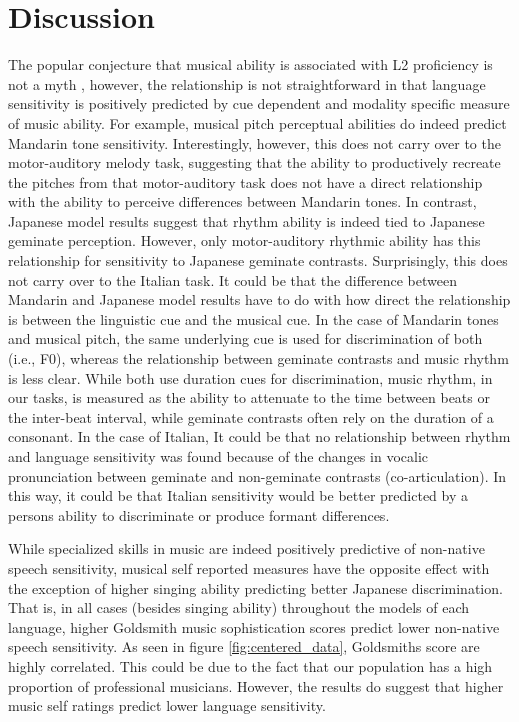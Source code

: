 \documentclass[a4paper]{article}
\begin{document}
\section{Discussion}

The popular conjecture that musical ability is associated with L2 proficiency is not a myth \cite{Slevc_Miyake_2006b}, however, the relationship is not straightforward in that language sensitivity is positively predicted by cue dependent and modality specific measure of music ability. For example, musical pitch perceptual abilities do indeed predict Mandarin tone sensitivity. Interestingly, however, this does not carry over to the motor-auditory melody task, suggesting that the ability to productively recreate the pitches from that motor-auditory task does not have a direct relationship with the ability to perceive differences between Mandarin tones. In contrast, Japanese model results suggest that rhythm ability is indeed tied to Japanese geminate perception. However, only motor-auditory rhythmic ability has this relationship for sensitivity to Japanese geminate contrasts. Surprisingly, this does not carry over to the Italian task. It could be that the difference between Mandarin and Japanese model results have to do with how direct the relationship is between the linguistic cue and the musical cue. In the case of Mandarin tones and musical pitch, the same underlying cue is used for discrimination of both (i.e., F0), whereas the relationship between geminate contrasts and music rhythm is less clear. While both use duration cues for discrimination, music rhythm, in our tasks, is measured as the ability to attenuate to the time between beats or the inter-beat interval, while geminate contrasts often rely on the duration of a consonant. In the case of Italian, It could be that no relationship between rhythm and language sensitivity was found because of the changes in vocalic pronunciation between geminate and non-geminate contrasts (co-articulation). In this way, it could be that Italian sensitivity would be better predicted by a persons ability to discriminate or produce formant differences. 

While specialized skills in music are indeed positively predictive of non-native speech sensitivity, musical self reported measures have the opposite effect with the exception of higher singing ability predicting better Japanese discrimination. That is, in all cases (besides singing ability) throughout the models of each language, higher Goldsmith music sophistication scores predict lower non-native speech sensitivity. As seen in figure \ref{fig:centered_data}, Goldsmiths score are highly correlated. This could be due to the fact that our population has a high proportion of professional musicians. However, the results do suggest that higher music self ratings predict lower language sensitivity.    
\end{document}
